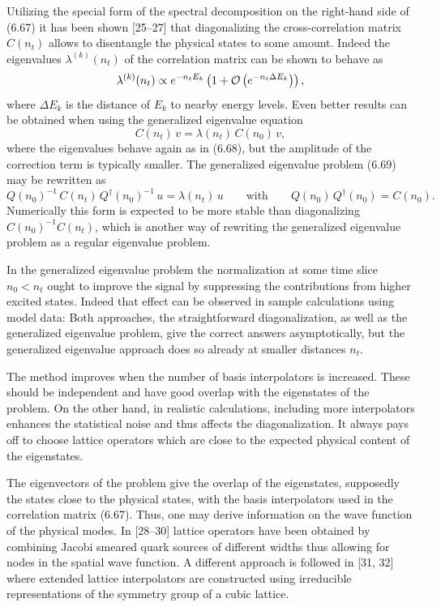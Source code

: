 Utilizing the special form of the spectral decomposition on the right-hand side
of (6.67) it has been shown [25--27] that diagonalizing the cross-correlation
matrix $C(n_t)$ allows to disentangle the physical states to some amount.
Indeed the eigenvalues $\lambda^{(k)}(n_t)$ of the correlation matrix can be
shown to behave as
\begin{equation}
  \lambda^{(k)}(n_t) \propto e^{-n_t E_k}\left( 1 +
    \mathcal{O}\left(e^{-n_t \Delta E_k}\right) \right),
\end{equation}
where $\Delta E_k$ is the distance of $E_k$ to nearby energy levels. Even
better results can be obtained when using the generalized eigenvalue equation
\begin{equation}
  C(n_t)\, v = \lambda(n_t)\, C(n_0)\, v ,
\end{equation}
where the eigenvalues behave again as in (6.68), but the amplitude of the
correction term is typically smaller. The generalized eigenvalue problem (6.69)
may be rewritten as
\begin{equation}
  Q(n_0)^{-1}\, C(n_t)\, Q^\dagger(n_0)^{-1}\, u = \lambda(n_t)\, u
  \qquad \text{with} \qquad Q(n_0)\, Q^\dagger(n_0) = C(n_0) .
\end{equation}
Numerically this form is expected to be more stable than diagonalizing
$C(n_0)^{-1}C(n_t)$, which is another way of rewriting the generalized
eigenvalue problem as a regular eigenvalue problem.

In the generalized eigenvalue problem the normalization at some time slice
$n_0 < n_t$ ought to improve the signal by suppressing the contributions from
higher excited states. Indeed that effect can be observed in sample calculations
using model data: Both approaches, the straightforward diagonalization, as well
as the generalized eigenvalue problem, give the correct answers asymptotically,
but the generalized eigenvalue approach does so already at smaller distances
$n_t$.

The method improves when the number of basis interpolators is increased. These
should be independent and have good overlap with the eigenstates of the
problem. On the other hand, in realistic calculations, including more
interpolators enhances the statistical noise and thus affects the
diagonalization. It always pays off to choose lattice operators which are close
to the expected physical content of the eigenstates.

The eigenvectors of the problem give the overlap of the eigenstates, supposedly
the states close to the physical states, with the basis interpolators used in
the correlation matrix (6.67). Thus, one may derive information on the wave
function of the physical modes. In [28--30] lattice operators have been
obtained by combining Jacobi smeared quark sources of different widths thus
allowing for nodes in the spatial wave function. A different approach is
followed in [31, 32] where extended lattice interpolators are constructed using
irreducible representations of the symmetry group of a cubic lattice.

